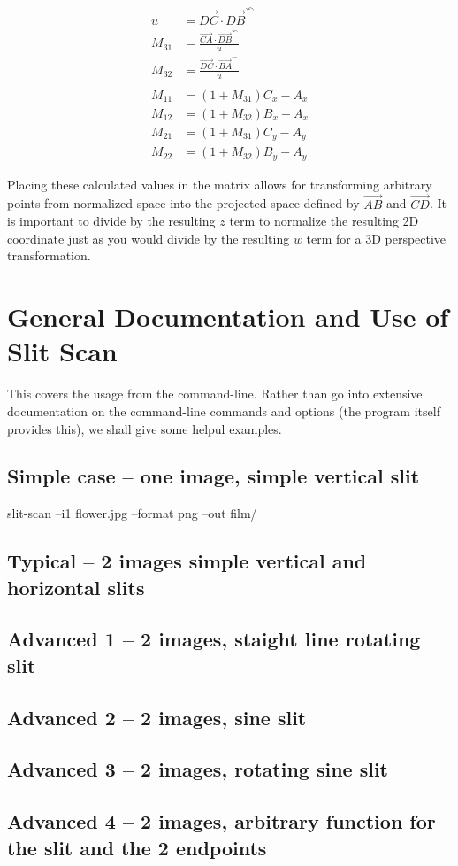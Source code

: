 \documentclass[letterpaper, 11pt]{article}
\begin{document}
\begin{align}
u &= \overrightarrow{DC} \cdot \overrightarrow{DB}^{\curvearrowleft} \\
M_{31} &= \frac{\overrightarrow{CA} \cdot \overrightarrow{DB}^{\curvearrowleft}}{u} \\
M_{32} &= \frac{\overrightarrow{DC} \cdot \overrightarrow{BA}^{\curvearrowleft}}{u} \\ \\
M_{11} &= (1 + M_{31})C_x - A_x \\
M_{12} &= (1 + M_{32})B_x - A_x \\
M_{21} &= (1 + M_{31})C_y - A_y \\
M_{22} &= (1 + M_{32})B_y - A_y
\end{align}

Placing these calculated values in the matrix allows for
transforming arbitrary points from normalized space into 
the projected space defined by \(\overrightarrow{AB}\) and \(\overrightarrow{CD}\).
It is important to divide by the resulting \(z\) term to normalize the resulting 2D
coordinate just as you would divide by the resulting \(w\) term for a 
3D perspective transformation.
$$

\section{General Documentation and Use of Slit Scan}
\label{sec:org54ac2eb}
This covers the usage from the command-line. Rather than go into extensive documentation
on the command-line commands and options (the program itself provides this), we shall
give some helpul examples.
\subsection{Simple case -- one image, simple vertical slit}
\label{sec:orgb1be918}
slit-scan --i1 flower.jpg --format png --out film/

\subsection{Typical -- 2 images simple vertical and horizontal slits}
\label{sec:org7edd5f5}
\subsection{Advanced 1 -- 2 images, staight line rotating slit}
\label{sec:org740c167}
\subsection{Advanced 2 -- 2 images, sine slit}
\label{sec:org52d1b9f}
\subsection{Advanced 3 -- 2 images, rotating sine slit}
\label{sec:orgf1728ea}
\subsection{Advanced 4 -- 2 images, arbitrary function for the slit and the 2 endpoints}
\label{sec:org35ad956}
\end{document}
